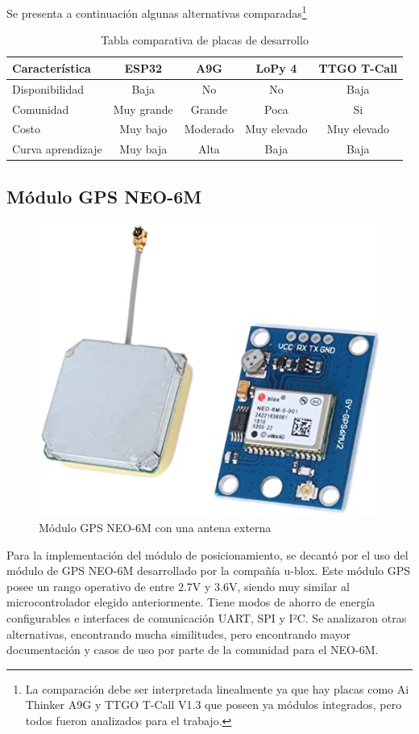 Se presenta a continuación algunas alternativas comparadas\footnote{La comparación debe ser interpretada linealmente ya que hay placas como Ai Thinker A9G y TTGO T-Call V1.3 que poseen ya módulos integrados, pero todos fueron analizados para el trabajo.}

\begin{table}[h]
	\centering
	\caption[Tabla comparativa]{Tabla comparativa de placas de desarrollo}
	\begin{tabular}{l c c c c}    
		\toprule
		\textbf{Característica} 	 & \textbf{ESP32} & \textbf{A9G} & \textbf{LoPy 4} & \textbf{TTGO T-Call}  \\
		\midrule
		Disponibilidad & Baja & No & No & Baja			\\		
		Comunidad & Muy grande & Grande & Poca & Si			\\
		Costo & Muy bajo & Moderado & Muy elevado & Muy elevado		\\
		Curva aprendizaje & Muy baja & Alta & Baja & Baja \\
		\bottomrule
		\hline
	\end{tabular}
	\label{tab:peces}
\end{table}


\subsection{Módulo GPS NEO-6M}

\begin{figure}[H]
	\centering
	\includegraphics[width=.6\textwidth]{./Figures/neo-6m.jpg}
	\caption{Módulo GPS NEO-6M con una antena externa}
	\label{fig:texmaker}
\end{figure}

Para la implementación del módulo de posicionamiento, se decantó por el uso del módulo de GPS NEO-6M desarrollado por la compañía u-blox. Este módulo GPS posee un rango operativo de entre 2.7V y 3.6V, siendo muy similar al microcontrolador elegido anteriormente. Tiene modos de ahorro de energía configurables e interfaces de comunicación UART, SPI y I²C\citep{NEO6M:1}. Se analizaron otras alternativas, encontrando mucha similitudes, pero encontrando mayor documentación y casos de uso por parte de la comunidad para el NEO-6M.

